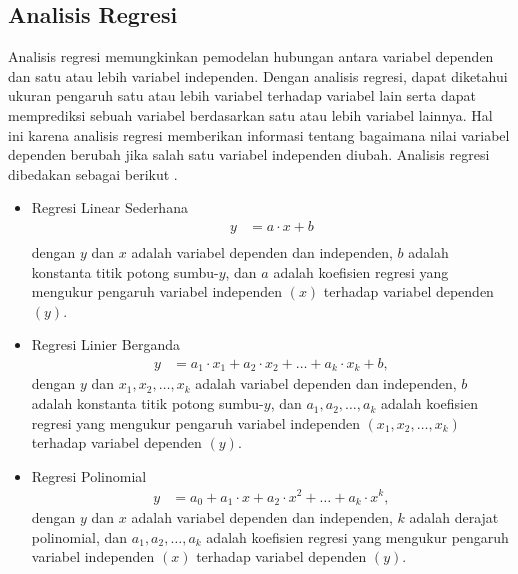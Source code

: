 \begin{spacing}{1.5}
		\subsection[Analisis Regresi]{Analisis Regresi}
		Analisis regresi memungkinkan pemodelan hubungan antara variabel dependen dan satu atau lebih variabel independen. Dengan analisis regresi, dapat diketahui ukuran pengaruh satu atau lebih variabel terhadap variabel lain serta dapat memprediksi sebuah variabel berdasarkan satu atau lebih variabel lainnya. Hal ini karena analisis regresi memberikan informasi tentang bagaimana nilai variabel dependen berubah jika salah satu variabel independen diubah. Analisis regresi dibedakan sebagai berikut  \cite{ANGELINI2019722}.
		\begin{itemize}
			\item Regresi Linear Sederhana
			\begin{equation}
				\begin{aligned}
					y &= a \cdot x+b\\
				\end{aligned}
			\end{equation}
			dengan $y$ dan $x$ adalah variabel dependen dan independen, $b$ adalah konstanta titik potong sumbu-$y$, dan $a$ adalah koefisien regresi yang mengukur pengaruh variabel independen $(x)$ terhadap variabel dependen $(y)$.
			\item Regresi Linier Berganda
			\begin{equation}
				\begin{aligned}
					y &= a_1 \cdot x_1+a_2 \cdot x_2+\dots+a_k \cdot x_k+b,
				\end{aligned}
			\end{equation}
			dengan $y$ dan $x_1,x_2,\dots,x_k$ adalah variabel dependen dan independen, $b$ adalah konstanta titik potong sumbu-$y$, dan $a_1,a_2,\dots,a_k$ adalah koefisien regresi yang mengukur pengaruh variabel independen $(x_1,x_2,\dots,x_k)$ terhadap variabel dependen $(y)$.
			\item Regresi Polinomial
			\begin{equation}
				\begin{aligned}
					y &= a_0+a_1 \cdot x+a_2 \cdot x^2+\dots+a_k \cdot x^k,
				\end{aligned}
			\end{equation}
			dengan $y$ dan $x$ adalah variabel dependen dan independen, $k$ adalah derajat polinomial, dan $a_1,a_2,\dots,a_k$ adalah koefisien regresi yang mengukur pengaruh variabel independen $(x)$ terhadap variabel dependen $(y)$.
		\end{itemize}
	

\end{spacing}
